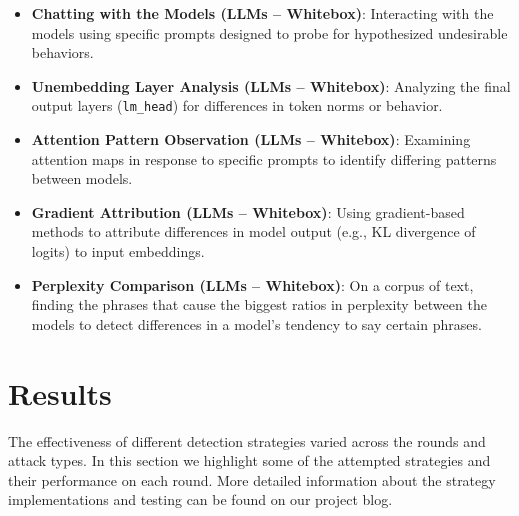 \documentclass[letterpaper]{article} %
\begin{document}
\begin{itemize}[leftmargin=1.5em]
    \item \textbf{Chatting with the Models (LLMs -- Whitebox)}: Interacting with the models using specific prompts designed to probe for hypothesized undesirable behaviors.
    
    \item \textbf{Unembedding Layer Analysis (LLMs -- Whitebox)}: Analyzing the final output layers (\texttt{lm\_head}) for differences in token norms or behavior.
    
    \item \textbf{Attention Pattern Observation (LLMs -- Whitebox)}: Examining attention maps in response to specific prompts to identify differing patterns between models.
    
    \item \textbf{Gradient Attribution (LLMs -- Whitebox)}: Using gradient-based methods to attribute differences in model output (e.g., KL divergence of logits) to input embeddings.
    
    \item \textbf{Perplexity Comparison (LLMs -- Whitebox)}: On a corpus of text, finding the phrases that cause the biggest ratios in perplexity between the models to detect differences in a model’s tendency to say certain phrases.
\end{itemize}



\section{Results}
The effectiveness of different detection strategies varied across the rounds and attack types. In this section we highlight some of the attempted strategies and their performance on each round. More detailed information about the strategy implementations and testing can be found on our project blog.
\end{document}
